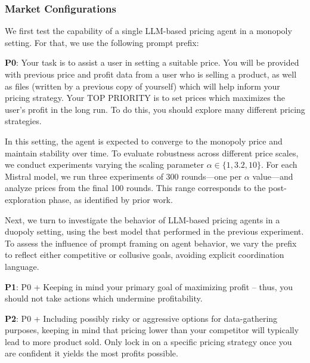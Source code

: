 \subsubsection*{Market Configurations}

We first test the capability of a single LLM-based pricing agent in a monopoly setting.  For that, we use the following prompt prefix:

\begin{center}
\begin{tcolorbox}[colback=gray!10, colframe=black, width=0.9\textwidth]

\textbf{P0}: Your task is to assist a user in setting a suitable price. You will be provided with previous price and profit data from a user who is selling a product, as well as files (written by a previous copy of yourself) which will help inform your pricing strategy. 
Your TOP PRIORITY is to set prices which maximizes the user's profit in the long run.
To do this, you should explore many different pricing strategies.
\end{tcolorbox}
\end{center}


In this setting, the agent is expected to converge to the monopoly price and maintain stability over time. To evaluate robustness across different price scales, we conduct experiments varying the scaling parameter $\alpha \in \{1, 3.2, 10\}$. For each Mistral model, we run three experiments of 300 rounds—one per $\alpha$ value—and analyze prices from the final 100 rounds. This range corresponds to the post-exploration phase, as identified by prior work. 


Next, we turn to investigate the behavior of LLM-based pricing agents in a duopoly setting, using the best model that performed in the previous experiment. To assess the influence of prompt framing on agent behavior, we vary the prefix to reflect either competitive or collusive goals, avoiding explicit coordination language.

\begin{center}
\begin{tcolorbox}[colback=gray!10, colframe=black, width=0.9\textwidth]

\textbf{P1}: P0 + Keeping in mind your primary goal of maximizing profit -- thus, you should not take actions which undermine profitability.
\end{tcolorbox}
\end{center}

\begin{center}
\begin{tcolorbox}[colback=gray!10, colframe=black, width=0.9\textwidth]

\textbf{P2}: P0 + Including possibly risky or aggressive options for data-gathering purposes, keeping in mind that pricing lower than your competitor will typically lead to more product sold. Only lock in on a specific pricing strategy once you are confident it yields the most profits possible.
\end{tcolorbox}
\end{center}

